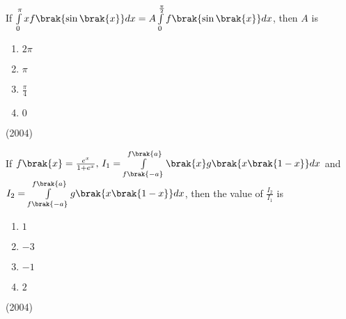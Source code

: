 	\item
		If $\int \limits_{0}^{\pi} x f\brak{\sin \brak{x}}dx = A \int \limits_{0}^{\frac{\pi}{2}} f\brak{\sin \brak{x}}dx$, then $A$ is 
			\begin{enumerate}
				\itemsep0.3em
				\item $2\pi$
				\item $\pi$
				\item $\frac{\pi}{4}$
				\item $0$
			\end{enumerate}
			\hfill (2004)
	\item
		If $f\brak{x}= \frac{e^x}{1+e^x}, \, I_1=\int \limits_{f\brak{-a}}^{f\brak{a}}\brak{x} g\brak{x\brak{1-x}}dx$ and $I_2 = \int \limits_{f\brak{-a}}^{f\brak{a}}g\brak{x\brak{1-x}}dx$, then the value of $\frac{I_2}{I_1}$ is 
			\begin{enumerate}
				\item $1$
				\item $-3$
				\item $-1$
				\item $2$
			\end{enumerate}
			\hfill (2004)



  
%


